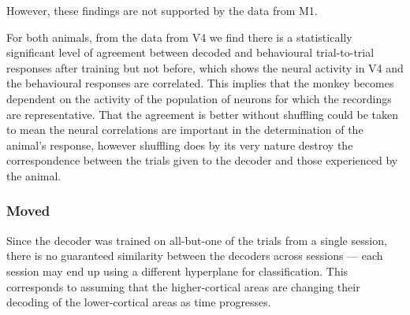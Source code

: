 However, these findings are not supported by the data from \ac{M1}.


For both animals, from the data from \ac{V4} we find there is a statistically significant level of agreement between decoded and behavioural trial-to-trial responses after training but not before, which shows the neural activity in \ac{V4} and the behavioural responses are correlated.
This implies that the monkey becomes dependent on the activity of the population of neurons for which the recordings are representative.
That the agreement is better without shuffling could be taken to mean the neural correlations are important in the determination of the animal's response, however shuffling does by its very nature destroy the correspondence between the trials given to the decoder and those experienced by the animal.


\subsubsection{Moved}

Since the decoder was trained on all-but-one of the trials from a single session, there is no guaranteed similarity between the decoders across sessions --- each session may end up using a different hyperplane for classification.
This corresponds to assuming that the higher-cortical areas are changing their decoding of the lower-cortical areas as time progresses.
